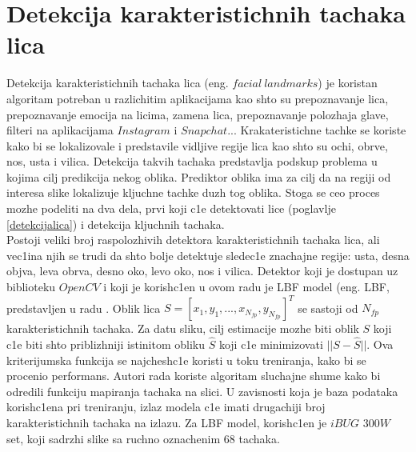 \documentclass[a4paper, openany, oneside, 11pt]{book}
\begin{document}
\section{Detekcija karakteristichnih tachaka lica}
Detekcija karakteristichnih tachaka lica (eng. $facial\ landmarks$) je koristan algoritam potreban u razlichitim aplikacijama kao shto su prepoznavanje lica, prepoznavanje emocija na licima, zamena lica, prepoznavanje polozhaja glave, filteri na aplikacijama $Instagram$ i $Snapchat$... Krakateristichne tachke se koriste kako bi se lokalizovale i predstavile vidljive regije lica kao shto su ochi, obrve, nos, usta i vilica. Detekcija takvih tachaka predstavlja podskup problema u kojima cilj predikcija nekog oblika. Prediktor oblika ima za cilj da na regiji od interesa slike lokalizuje kljuchne tachke duzh tog oblika. Stoga se ceo proces mozhe podeliti na dva dela, prvi koji c1e detektovati lice (poglavlje \ref{detekcijalica}) i detekcija kljuchnih tachaka.\\
Postoji veliki broj raspolozhivih detektora karakteristichnih tachaka lica, ali vec1ina njih se trudi da shto bolje detektuje sledec1e znachajne regije: usta, desna objva, leva obrva, desno oko, levo oko, nos i vilica. Detektor koji je dostupan uz biblioteku $OpenCV$ i koji je korish\-c1en u ovom radu je \acrshort{LBF} model (eng. \acrlong{LBF}, predstavljen u radu \cite{LBF}. Oblik lica $S=[x_1, y_1,...,x_{N_{fp}},y_{N_{fp}}]^T$ se sastoji od $N_{fp}$ karakteristichnih tachaka. Za datu sliku, cilj estimacije mozhe biti oblik $S$ koji c1e biti shto priblizhniji istinitom obliku $\hat{S}$ koji c1e minimizovati $||S-\hat{S}||$. Ova kriterijumska funkcija se najchesh\-c1e koristi u toku treniranja, kako bi se procenio performans. Autori rada \cite{LBF} koriste algoritam sluchajne shume kako bi odredili funkciju mapiranja tachaka na slici.
U zavisnosti koja je baza podataka korishc1ena pri treniranju, izlaz modela c1e imati drugachiji broj karakteristichnih tachaka na izlazu. Za \acrshort{LBF} model, korish\-c1en je $iBUG$ $300W$ set, koji sadrzhi slike sa ruchno oznachenim 68 tachaka.
\end{document}
